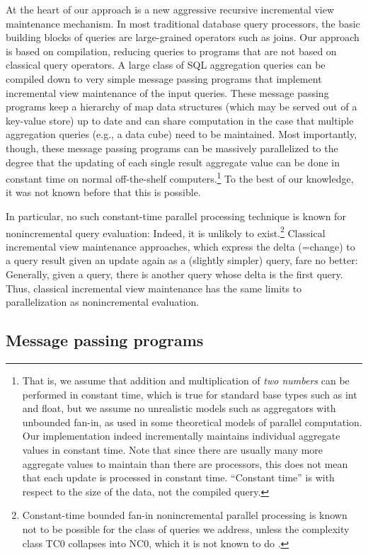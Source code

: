 At the heart of our approach is a new aggressive recursive incremental
view maintenance mechanism.
In most traditional database query processors, the  basic building blocks of
queries are large-grained operators such as joins.
Our approach is based on compilation, reducing
queries to programs that are not based on classical query operators.
A large class of
SQL aggregation queries can be compiled down to very simple message
passing programs that implement incremental view maintenance of
the input queries. These message passing programs keep a hierarchy of map data
structures (which may be served out of a key-value store) up to date
and can share computation in the case that multiple aggregation queries (e.g.,
a data cube) need to be maintained.  Most importantly, though, these message
passing programs can be massively parallelized to the degree that the updating
of each single result aggregate value can be done in constant time on normal
off-the-shelf computers.\footnote{That is,
we assume that addition and multiplication
of {\em two numbers} can be performed in constant time, which is true for
%
%
standard base types such as int and float,
but we assume no unrealistic models such
as aggregators with unbounded fan-in, as used in some theoretical models of
parallel computation. Our implementation indeed incrementally maintains
individual aggregate values in constant time. Note that since there are
usually many more aggregate values to maintain than there are processors,
this does not mean that each update is processed in constant time.
``Constant time'' is with respect to the size of the data, not the compiled
query.}
To the best of our knowledge, it was not known before
that this is possible.

In particular, no such constant-time parallel processing technique
is known for nonincremental query
evaluation: Indeed, it is unlikely to exist.\footnote{Constant-time
bounded fan-in nonincremental
parallel processing is known not to be possible for
the class of queries we address,
unless the complexity class TC0 collapses into NC0, which it is not known
to do \cite{Joh90}.} Classical incremental view maintenance approaches, which
express the delta (=change) to a query result given an update again
as a (slightly simpler) query, fare no better: Generally,
given a query, there is another query whose delta is the first query.
Thus, classical incremental view maintenance has the same limits to
parallelization as nonincremental evaluation.


\subsection{Message passing programs}


